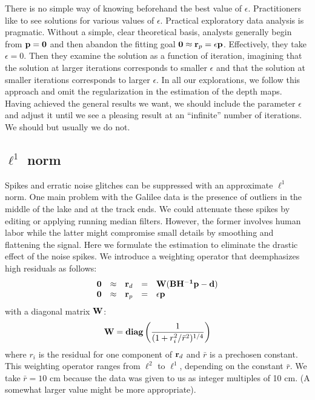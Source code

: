 \par
There is no simple way of knowing beforehand the best value of $\epsilon$.
Practitioners like to see solutions for various values of $\epsilon$.
Practical exploratory data analysis is pragmatic.
Without a simple, clear theoretical basis, analysts
generally begin from ${\bf p=0}$ and then abandon the fitting goal
$\bold 0 \approx  \bold r_p =\epsilon \bold p$.
Effectively, they take $\epsilon=0$.
Then they examine the solution as a function
of iteration, imagining that the solution at larger iterations
corresponds to smaller $\epsilon$ and that the solution at smaller iterations
corresponds to larger $\epsilon$.
In all our explorations, we follow this approach
and omit the regularization in the estimation of the depth maps.
Having achieved the general results we want,
we should include the parameter $\epsilon$ and adjust it until
we see a pleasing result at an ``infinite'' number of iterations.
We should but usually we do not.


\subsection{${\ell^1}$ norm}


Spikes and erratic noise glitches can be suppressed
with an approximate $\ell^1$ norm.
One main problem with the Galilee data is the presence of outliers
in the middle of the lake and at the track ends.
We could attenuate these spikes by editing or applying running median filters.
However, the former involves human labor
while the latter might compromise small details
by smoothing and flattening the signal.
Here we formulate the estimation
to eliminate the drastic effect of the noise spikes.
We introduce a weighting operator that deemphasizes high residuals as follows:
\begin{equation}
  \begin{array}{lllll}
    \bold 0 &\approx& \bold r_d &=& \bold W ( \bold B \bold {H^{-1}} \bold p - \bold d
    )\\
    \bold 0 &\approx&  \bold r_p &=& \epsilon \bold p
  \end{array} \label{eq3}
\end{equation}
with a diagonal matrix $\bf{W}$:
\begin{equation}
{\bf W} = {\bf diag} \left( \frac{1}{(1+r_i^2/\bar{r}^2)^{1/4}} \right)
\end{equation}
where $r_i$ is the residual for one component of $\bold r_d$
and $\bar{r}$ is a prechosen constant. This weighting operator
ranges from $\ell^2$ to $\ell^1$, depending on the constant $\bar{r}$.
We take $\bar{r}=10$ cm
because the data was given to us as integer multiples of 10 cm.
(A somewhat larger value might be more appropriate).


